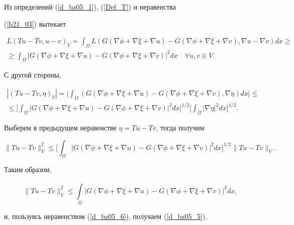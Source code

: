 \begin{pf}


Из определений (\ref{d_bz05_1}), (\ref{Def_T}) и неравенства


(\ref{b21_03}) вытекает


\begin{multline}


L (T u -T v, u -v)_V =\int_{\Omega } L 


(G(\nabla \phi +\nabla \xi +\nabla u)-G(\nabla \phi +\nabla \xi +\nabla v),


\nabla u -\nabla v)dx \geq \\


%


\geq\int_{\Omega }


|G(\nabla \phi +\nabla \xi +\nabla u)-G(\nabla \phi +\nabla \xi +\nabla


v)|^2 dx\quad \forall u, v \in V. \label{d_bz05_6}


\end{multline}





С другой стороны,


\begin{gather*}


|(T u -T v, \eta)_V|=\bigg|\int_{\Omega }


(G(\nabla \phi +\nabla \xi +\nabla u)-G(\nabla \phi +\nabla \xi +\nabla v),


\nabla \eta) dx \bigg|\leq \\


%


\leq\bigg[\int_{\Omega }


|G(\nabla \phi +\nabla \xi +\nabla u)-G(\nabla \phi +\nabla \xi +\nabla


v)|^2 dx\bigg]^{1/2} 


\bigg[\int_{\Omega }|\nabla \eta|^2 dx\bigg]^{1/2}.




\end{gather*}


Выберем в предыдущем неравенстве $\eta = T u -T v$, тогда получим


$$


\|T u -T v \|^2_V \leq


\bigg[\int_{\Omega }|G(\nabla \phi +\nabla \xi +\nabla u)-


G(\nabla \phi +\nabla \xi +\nabla v)|^2 dx \bigg]^{1/2} 


\|T u -T v \|_V.


$$





Таким образом,


$$


\|T u -T v \|^2_V \leq \int\limits^{}_{\Omega }


|G(\nabla \phi +\nabla \xi +\nabla u)-G(\nabla \phi +\nabla \xi +\nabla


v)|^2 dx,


$$


и, пользуясь неравенством (\ref{d_bz05_6}), получаем (\ref{d_bz05_5}).


\end{pf}
